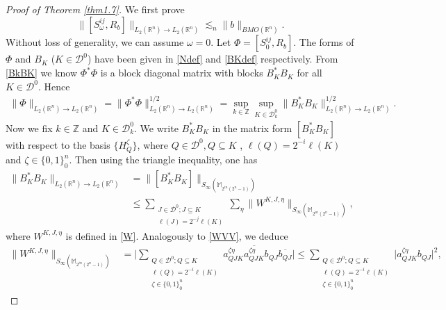 \documentclass[oneside,english,a4wide]{amsart}
\numberwithin{equation}{section}
\numberwithin{figure}{section}
\theoremstyle{plain}
\theoremstyle{plain}
\theoremstyle{definition}
\theoremstyle{plain}
\theoremstyle{remark}
\theoremstyle{definition}
\theoremstyle{remark}
\theoremstyle{definition}
\newcommand{\8}{\infty}
\begin{document}
\begin{proof}[Proof of Theorem \ref{thm1.7}]
We first prove
\begin{equation}\label{22}
	\|[S_\omega^{ij},R_b]\|_{L_2(\mathbb{R}^n)\to L_2(\mathbb{R}^n)}\lesssim_{n} \|b\|_{BMO(\mathbb{R}^n)} .
\end{equation}
Without loss of generality, we can assume $\omega=0$.
Let $\varPhi=[S^{ij}_0,R_b]$. The forms of $\varPhi$ and $B_K$ ($K\in\mathcal{D}^0$) have been given in \eqref{Ndef} and \eqref{BKdef} respectively. From \eqref{BkBK} we know $\varPhi^*\varPhi$ is a block diagonal matrix with blocks $B_K^*B_K$ for all $K\in \mathcal{ D}^0$. Hence
\begin{equation}\label{Nf2}
	\begin{aligned}
		\|\varPhi\|_{L_2(\mathbb{R}^n)\to L_2(\mathbb{R}^n)}=\|\varPhi^*\varPhi\|_{L_2(\mathbb{R}^n)\to L_2(\mathbb{R}^n)}^{1/2}=\sup_{k\in\mathbb{Z}}\sup_{K\in\mathcal{D}^0_k}\|B^*_KB_K\|_{L_2(\mathbb{R}^n)\to L_2(\mathbb{R}^n)}^{1/2}.
	\end{aligned}
\end{equation}
Now we fix $k\in\mathbb{Z}$ and $K\in\mathcal{D}^0_k$. We write $B_K^*B_K$ in the matrix form $[B_K^*B_K]$ with respect to the basis $\{H_Q^\zeta\}$, where $Q\in\mathcal{D}^0, Q\subseteq K$ , $\ell(Q)=2^{-i}\ell(K)$ and $\zeta\in\{0,1\}^n_0$. Then using the triangle inequality, one has
\begin{equation*}
	\begin{aligned}
		\|B^*_KB_K\|_{L_2(\mathbb{R}^n)\to L_2(\mathbb{R}^n)}{}&=\|[B_K^*B_K]\|_{S_\infty(\mathbb{M}_{2^{in}(2^n-1)})}\\&\le \sum_{\substack{J\in\mathcal{D}^0;J\subseteq K\\ \ell(J)=2^{-j}\ell(K)}}\sum_{\eta}\big\|W^{K,J,\eta}\big\|_{S_\infty(\mathbb{M}_{2^{in}(2^n-1)})},
	\end{aligned}
\end{equation*}
where $W^{K,J,\eta}$ is defined in \eqref{W}.
Analogously to \eqref{WVV}, we deduce
\begin{equation*}
	\begin{aligned}
		\big\|W^{K,J,\eta}\big\|_{S_\infty(\mathbb{M}_{2^{in}(2^n-1)})}{}
		&=\bigg|\sum_{\substack{{Q}\in\mathcal{D}^0;{Q}\subseteq K \\ \ell({Q})=2^{-i}\ell(K)\\ {\zeta}\in\{0,1\}^n_0}}a_{{Q}JK}^{{\zeta}\eta}\overline{a_{{Q}JK}^{{\zeta}\eta}}b_{{Q}J}\overline{b_{{Q}J}} \bigg|
		\le\sum_{\substack{{Q}\in\mathcal{D}^0;{Q}\subseteq K \\ \ell({Q})=2^{-i}\ell(K)\\ {\zeta}\in\{0,1\}^n_0}}\bigg|a_{{Q}JK}^{{\zeta}\eta}b_{{Q}J} \bigg|^2,

\end{aligned}
\end{equation*}
\end{proof}
\end{document}
